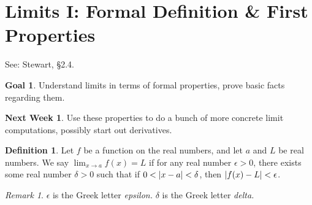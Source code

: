 \documentclass[english]{book}
\DeclarePairedDelimiter\abs{\lvert}{\rvert}%
\theoremstyle{remark}
\newtheorem{remark}{Remark}[theorem]
\theoremstyle{definition}
\newtheorem{definition}[theorem]{Definition}
\newtheorem*{goal}{Goal}
\newtheorem*{next week}{Next Week}
\begin{document}
\section{Limits I: Formal Definition \& First Properties}
See: Stewart, \S2.4.
\begin{goal}
	Understand limits in terms of formal properties, prove basic facts regarding them.
\end{goal}
\begin{next week}
Use these properties to do a bunch of more concrete limit computations, possibly start out derivatives.
\end{next week}
\begin{definition}\label{def:lim}
	Let $f$ be a function on the real numbers, and let $a$ and $L$ be real numbers. We say $\displaystyle\lim_{x\to a}f(x)=L$ if for any real number $\epsilon>0$, there exists some real number $\delta>0$ such that if $0<\abs{x-a}<\delta$, then $\abs{f(x)-L}<\epsilon$.
\end{definition}
\begin{remark}
	$\epsilon$ is the Greek letter \emph{epsilon.} $\delta$ is the Greek letter \emph{delta.}
\end{remark}
\end{document}

